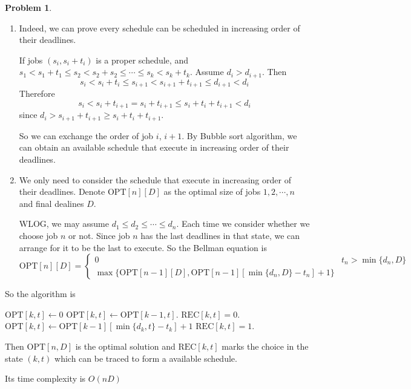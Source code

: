 \documentclass[a4paper]{article}
\theoremstyle{definition}
\newtheorem{problem}{Problem}
\theoremstyle{plain}
\newcommand{\OPT}{\mathrm{OPT}}
\numberwithin{equation}{problem}
\begin{document}
\begin{problem}
    \begin{enumerate}[label=(\alph*)]
        \item Indeed, we can prove every schedule can be scheduled in increasing order of their deadlines.
        
        If jobs  $ (s_i,s_i+t_i) $ is a proper schedule, and  $ s_1<s_1+t_1 \leq s_2<s_2+s_2 \leq \cdots \leq s_k<s_k+t_k $. Assume  $ d_i>d_{i+1} $. Then 
        \[s_i<s_i+t_i \leq s_{i+1}<s_{i+1}+t_{i+1} \leq d_{i+1}<d_i\]
        Therefore
        \[s_i<s_i+t_{i+1}=s_i+t_{i+1} \leq s_i+t_i+t_{i+1}<d_i\]
        since  $ d_i>s_{i+1}+t_{i+1} \geq s_i+t_i+t_{i+1} $.
        
        So  we can exchange the order of job  $ i $, $ i+1 $. By Bubble sort algorithm, we can obtain an available schedule that execute in increasing order of their deadlines.

        \item We only need to consider the schedule that execute in increasing order of their deadlines.
        Denote  $ \OPT[n][D] $ as the optimal size of jobs $ 1,2,\cdots,n $  and final dealines  $ D $.

        WLOG, we may assume  $ d_1 \leq d_2 \leq \cdots \leq d_n $.
        Each time we consider whether we choose job  $ n $ or not. Since job  $ n $ has the last deadlines in that state, we can arrange for it to be the last to   execute. So the Bellman equation is 
        \[\OPT[n][D]=\begin{cases}
            0&t_n>\min\{d_n,D\}\\
            \max\{\OPT[n-1][D],\OPT[n-1][\min\{d_n,D\}-t_n]+1\}
        \end{cases}\]  
    \end{enumerate}
    So the algorithm is 
    
    \begin{algorithm}
        \caption{$ \OPT $}
        \begin{algorithmic}[1]
            \STATE $ \OPT[k,t]\leftarrow0 $  \ENDIF 
            \STATE  $ \OPT[k,t]\leftarrow \OPT[k-1,t] $.
            \STATE  $ \mathrm{REC}[k,t]=0 $.
            \IF{ $ \OPT[k,t]<\OPT[k-1][\min\{d_k,t\}-t_k]+1 $ }
                \STATE     $ \OPT[k,t]\leftarrow\OPT[k-1][\min\{d_k,t\}-t_k]+1 $
                \STATE  $ \mathrm{REC}[k,t]=1 $.
            \ENDIF 
            \ENDFOR
        \end{algorithmic}
    \end{algorithm}


    Then  $ \OPT[n,D] $ is the optimal solution and  $ \mathrm{REC}[k,t] $ marks the choice in the state  $ (k,t) $ which can be traced to form a available schedule.
    
    Its time complexity is  $ O(nD) $ 
\end{problem}
\end{document}
